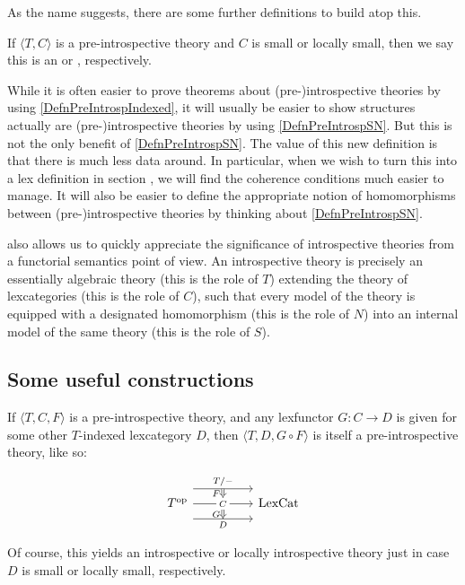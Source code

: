 As the name  suggests, there are some further definitions to build atop this.

\begin{definition}\label{DefnIntrosp}
If $\langle T, C \rangle$ is a pre-introspective theory and $C$ is small or locally small, then we say this is an  or , respectively.
\end{definition}

While it is often easier to prove theorems about (pre-)introspective theories by using \cref{DefnPreIntrospIndexed}, it will usually be easier to show structures actually are (pre-)introspective theories by using \cref{DefnPreIntrospSN}. But this is not the only benefit of \cref{DefnPreIntrospSN}. The value of this new definition is that there is much less data around. In particular, when we wish to turn this into a lex definition in section \TODO, we will find the coherence conditions much easier to manage. It will also be easier to define the appropriate notion of homomorphisms between (pre-)introspective theories by thinking about \cref{DefnPreIntrospSN}.

 also allows us to quickly appreciate the significance of introspective theories from a functorial semantics point of view. An introspective theory is precisely an essentially algebraic theory (this is the role of $T$) extending the theory of lexcategories (this is the role of $C$), such that every model of the theory is equipped with a designated homomorphism (this is the role of $N$) into an internal model of the same theory (this is the role of $S$).

\subsection{Some useful constructions}
\begin{construction}\label{IntrospInternalMap}
If $\langle T, C, F \rangle$ is a pre-introspective theory, and any lexfunctor $G : C \to D$ is given for some other $T$-indexed lexcategory $D$, then $\langle T, D, G \circ F \rangle$ is itself a pre-introspective theory, like so: 

\[\begin{tikzcd}
	{\op{T}} && {\LexCat}
	\arrow["{T/-}"{name=0}, from=1-1, to=1-3, shift left=5]
	\arrow["{C}"{name=1, description}, from=1-1, to=1-3]
	\arrow["{D}"{name=2, swap}, from=1-1, to=1-3, shift right=5]
	\arrow[Rightarrow, "{F}"', from=0, to=1]
	\arrow[Rightarrow, "{G}"', from=1, to=2]
\end{tikzcd}\]

Of course, this yields an introspective or locally introspective theory just in case $D$ is small or locally small, respectively.
\end{construction}

